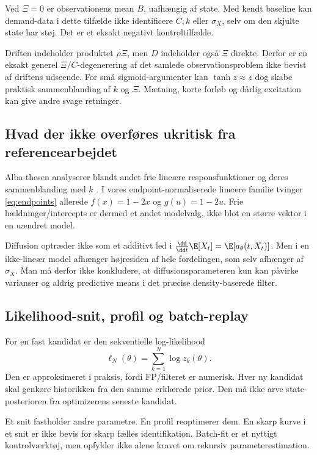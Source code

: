 Ved \(\Xi=0\) er observationens mean \(B\), uafhængig af state. Med kendt baseline kan demand-data i dette tilfælde ikke identificere \(C,k\) eller \(\sigma_X\), selv om den skjulte state har støj. Det er et eksakt negativt kontroltilfælde.

Driften indeholder produktet \(\rho\Xi\), men \(D\) indeholder også \(\Xi\) direkte. Derfor er en eksakt generel \(\Xi/C\)-degenerering af det samlede observationsproblem ikke bevist af driftens udseende. For små sigmoid-argumenter kan \(\tanh z\approx z\) dog skabe praktisk sammenblanding af \(k\) og \(\Xi\). Mætning, korte forløb og dårlig excitation kan give andre svage retninger.

\subsection{Hvad der ikke overføres ukritisk fra referencearbejdet}
Alba-thesen analyserer blandt andet frie lineære responsfunktioner og deres sammenblanding med \(k\) \cite{alba}. I vores endpoint-normaliserede lineære familie tvinger \eqref{eq:endpoints} allerede \(f(x)=1-2x\) og \(g(u)=1-2u\). Frie hældninger/intercepts er dermed et andet modelvalg, ikke blot en større vektor i en uændret model.

Diffusion optræder ikke som et additivt led i \(\frac{\dd}{\dd t}\E[X_t]=\E[a_\theta(t,X_t)]\). Men i en ikke-lineær model afhænger højresiden af hele fordelingen, som selv afhænger af \(\sigma_X\). Man må derfor ikke konkludere, at diffusionsparameteren kun kan påvirke varianser og aldrig predictive means i det præcise density-baserede filter.

\subsection{Likelihood-snit, profil og batch-replay}
For en fast kandidat er den sekventielle log-likelihood
\begin{equation}
 \ell_N(\theta)=\sum_{k=1}^N\log z_k(\theta).
 \label{eq:batch}
\end{equation}
Den er approksimeret i praksis, fordi FP/filteret er numerisk. Hver ny kandidat skal genkøre historikken fra den samme erklærede prior. Den må ikke arve state-posterioren fra optimizerens seneste kandidat.

Et snit fastholder andre parametre. En profil reoptimerer dem. En skarp kurve i et snit er ikke bevis for skarp fælles identifikation. Batch-fit er et nyttigt kontrolværktøj, men opfylder ikke alene kravet om rekursiv parameterestimation.

